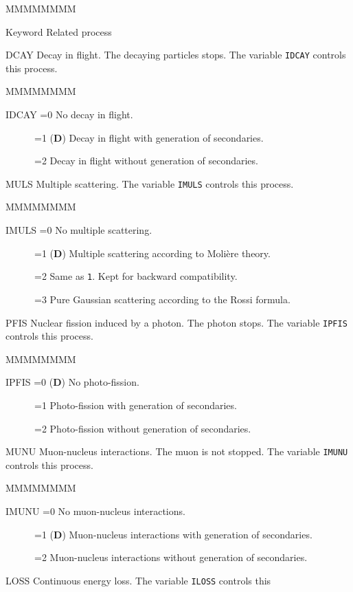\begin{DLtt}{MMMMMMMM}
\item[Keyword] Related process 
\item[DCAY] Decay in flight. The decaying particles stops.
The variable {\tt IDCAY} controls this process.
\begin{DLtt}{MMMMMMMM}
\item[IDCAY =0] No decay in flight.
\item[~~~~~~=1] ({\bf D}) Decay in flight with generation of secondaries.
\item[~~~~~~=2] Decay in flight without generation of secondaries.
\end{DLtt}
\item[MULS] Multiple scattering. The variable {\tt IMULS} controls this process.
\begin{DLtt}{MMMMMMMM}
\item[IMULS =0] No multiple scattering.
\item[~~~~~~=1] ({\bf D}) Multiple scattering according to Moli\`ere theory.
\item[~~~~~~=2] Same as {\tt 1}. Kept for backward compatibility.
\item[~~~~~~=3] Pure Gaussian scattering according to the Rossi formula.
\end{DLtt}
\item[PFIS] Nuclear fission induced by a photon. The photon stops.
The variable {\tt IPFIS} controls this process.
\begin{DLtt}{MMMMMMMM}
\item[IPFIS =0] ({\bf D}) No photo-fission.
\item[~~~~~~=1] Photo-fission with generation of secondaries.
\item[~~~~~~=2] Photo-fission without generation of secondaries.
\end{DLtt}
\item[MUNU] Muon-nucleus interactions. The muon is not stopped.
The variable {\tt IMUNU} controls this process.
\begin{DLtt}{MMMMMMMM}
\item[IMUNU =0] No muon-nucleus interactions.
\item[~~~~~~=1] ({\bf D}) Muon-nucleus interactions with generation of 
secondaries.
\item[~~~~~~=2] Muon-nucleus interactions without generation of secondaries.
\end{DLtt}
\item[LOSS] Continuous energy loss. The variable {\tt ILOSS} controls this 

\end{DLtt}

